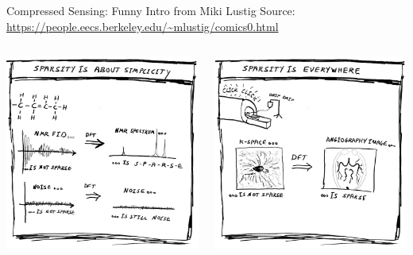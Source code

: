 \documentclass[aspectratio=169]{beamer}
\begin{document}
	\begin{frame}{Compressed Sensing: Funny Intro from Miki Lustig}
		Source: \url{https://people.eecs.berkeley.edu/~mlustig/comics0.html}
		\vspace{1em}
		\begin{columns}
			\centering
			\includegraphics[width=\columnwidth]{figures/cs-lustig-comics-07.png}
			
			\centering
			\includegraphics[width=\columnwidth]{figures/cs-lustig-comics-08.png}
		\end{columns}
	\end{frame}
	
\end{document}
